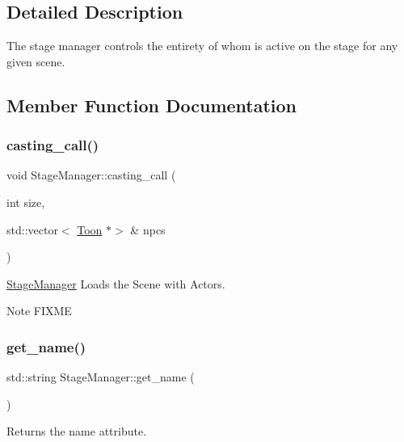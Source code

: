 \subsection{Detailed Description}
The stage manager controls the entirety of whom is active on the stage for any given scene. 

\subsection{Member Function Documentation}
\mbox{\label{classStageManager_a1fb738edf603ba2e32d30f93ba5b7f8d}} 
\subsubsection{\texorpdfstring{casting\+\_\+call()}{casting\_call()}}
{\footnotesize\ttfamily void Stage\+Manager\+::casting\+\_\+call (\begin{DoxyParamCaption}\item[{int}]{size,  }\item[{std\+::vector$<$ \mbox{\hyperlink{classToon}{Toon}} $\ast$$>$ \&}]{npcs }\end{DoxyParamCaption})}



\mbox{\hyperlink{classStageManager}{Stage\+Manager}} Loads the Scene with Actors. 

\begin{DoxyNote}{Note}
F\+I\+X\+ME 
\end{DoxyNote}
\mbox{\label{classStageManager_a6d08dfabf7c6f226d199c5f1ea5795a1}} 
\subsubsection{\texorpdfstring{get\+\_\+name()}{get\_name()}}
{\footnotesize\ttfamily std\+::string Stage\+Manager\+::get\+\_\+name (\begin{DoxyParamCaption}{ }\end{DoxyParamCaption})}



Returns the name attribute. 


